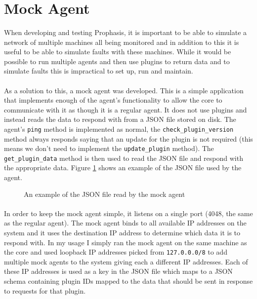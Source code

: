 \documentclass[bsc,logo,twoside,singlespacing,notimes]{infthesis}
\begin{document}
	
\section{Mock Agent}
\paragraph*{}
	When developing and testing Prophasis, it is important to be able to simulate a
	network of multiple machines all being monitored and in addition to this it
	is useful to be able to simulate faults with these machines. While it would be
	possible to run multiple agents and then use plugins to return data and to
	simulate faults this is impractical to set up, run and maintain.
	
\paragraph*{}
	As a solution to this, a mock agent was developed.  This is a simple application
	that implements enough of the agent's functionality to allow the core to
	communicate with it as though it is a regular agent.  It does not use plugins
	and instead reads the data to respond with from a JSON file stored on disk. The
	agent's \texttt{ping} method is implemented as normal, the
	\texttt{check\_plugin\_version} method always responds saying that an update for
	the plugin is not required (this means we don't need to implement the
	\texttt{update\_plugin} method).  The \texttt{get\_plugin\_data} method is then
	used to read the JSON file and respond with the appropriate data. Figure
	\ref{mock-agent-data} shows an example of the JSON file used by the agent.
	
\begin{figure}[H]
	\caption{An example of the JSON file read by the mock agent}
	\label{mock-agent-data}
	
\end{figure}
	
\paragraph*{}
	In order to keep the mock agent simple, it listens on a single port (4048, the
	same as the regular agent).  The mock agent binds to all available IP addresses
	on the system and it uses the destination IP address to determine which data it
	is to respond with.  In my usage I simply ran the mock agent on the same machine
	as the core and used loopback IP addresses picked from \texttt{127.0.0.0/8} to
	add multiple mock agents to the system giving each a different IP addresses.
	Each of these IP addresses is used as a key in the JSON file which maps to a
	JSON schema containing plugin IDs mapped to the data that should be sent in
	response to requests for that plugin.
	
\end{document}
